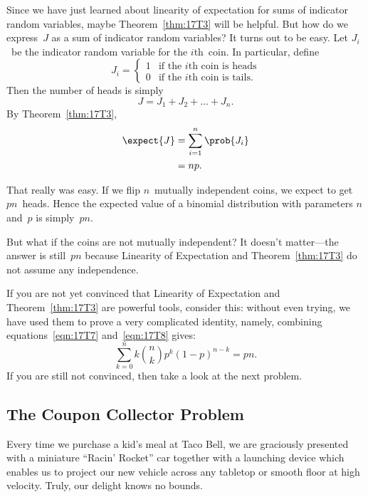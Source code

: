 Since we have just learned about linearity of expectation for sums of
indicator random variables, maybe Theorem~\ref{thm:17T3} will be
helpful.  But how do we express~$J$ as a sum of indicator random
variables?  It turns out to be easy.  Let $J_i$~be the indicator
random variable for the $i$th~coin.  In particular, define
\begin{equation*}
J_i = \begin{cases}
        1 & \text{if the $i$th coin is heads} \\
        0 & \text{if the $i$th coin is tails}.
      \end{cases}
\end{equation*}
Then the number of heads is simply
\begin{equation*}
    J = J_1 + J_2 + \dots + J_n.
\end{equation*}
By Theorem~\ref{thm:17T3},
\begin{align}
\expect{J}
    &= \sum_{i = 1}^n \prob{J_i} \notag\\
    &= np. \label{eqn:17T8}
\end{align}

That really was easy.  If we flip $n$~mutually independent coins, we
expect to get $pn$~heads.  Hence the expected value of a binomial
distribution with parameters $n$ and~$p$ is simply~$pn$.

But what if the coins are not mutually independent?  It doesn't
matter---the answer is still~$p n$ because Linearity of Expectation
and Theorem~\ref{thm:17T3} do not assume any independence.

If you are not yet convinced that Linearity of Expectation and
Theorem~\ref{thm:17T3} are powerful tools, consider this: without even
trying, we have used them to prove a very complicated identity,
namely, combining equations~\eqref{eqn:17T7} and~\eqref{eqn:17T8} gives:
\[
    \sum_{k = 0}^n k \binom{n}{k} p^k (1 - p)^{n - k} = p n.
\]
If you are still not convinced, then take a look at the next problem.

\subsection{The Coupon Collector Problem}

Every time we purchase a kid's meal at Taco Bell, we are graciously
presented with a miniature ``Racin' Rocket'' car together with a
launching device which enables us to project our new vehicle across
any tabletop or smooth floor at high velocity.  Truly, our delight
knows no bounds.

